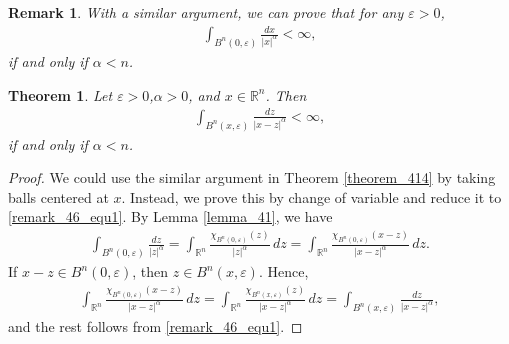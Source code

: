 \documentclass[11pt]{book}
\newtheorem{theorem}{Theorem}[chapter]
\newtheorem{remark}{Remark}[chapter]
\theoremstyle{definition}
\numberwithin{equation}{chapter}
\begin{document}
\begin{remark}
With a similar argument, we can prove that for any $\varepsilon > 0$,
\begin{align}\label{remark_46_equ1}
    \int_{B^n(0,\varepsilon)} \frac{dx}{\left|x\right|^{\alpha}} < \infty,
\end{align}
if and only if $\alpha < n$.
\end{remark}

\medskip

\begin{theorem}\label{theorem_415}
Let $\varepsilon > 0$,$\alpha > 0$, and $x \in \mathbb{R}^n$. Then
\begin{align*}
    \int_{B^n(x,\varepsilon)} \frac{dz}{\left|x-z\right|^{\alpha}} < \infty,
\end{align*}
if and only if $\alpha < n$.
\end{theorem}
\begin{proof}
We could use the similar argument in Theorem \ref{theorem_414} by taking balls centered at $x$. Instead, we prove this by change of variable and reduce it to \eqref{remark_46_equ1}. By Lemma \ref{lemma_41}, we have
\begin{align*}
    \int_{B^n(0,\varepsilon)} \frac{dz}{\left|z\right|^{\alpha}} = \int_{\mathbb{R}^n} \frac{\chi_{B^n(0,\varepsilon)}(z)}{\left|z\right|^{\alpha}}\,dz = \int_{\mathbb{R}^n} \frac{\chi_{B^n(0,\varepsilon)}(x - z)}{\left|x - z\right|^{\alpha}}\,dz.
\end{align*}
If $x - z \in B^n(0,\varepsilon)$, then $z \in B^n(x,\varepsilon)$. Hence,
\begin{align*}
    \int_{\mathbb{R}^n} \frac{\chi_{B^n(0,\varepsilon)}(x - z)}{\left|x - z\right|^{\alpha}}\,dz = \int_{\mathbb{R}^n} \frac{\chi_{B^n(x,\varepsilon)} (z)}{\left|x - z\right|^{\alpha}}\,dz = \int_{B^n(x,\varepsilon)} \frac{dz}{\left|x - z\right|^{\alpha}},
\end{align*}
and the rest follows from \eqref{remark_46_equ1}.
\end{proof}

\medskip
\end{document}
